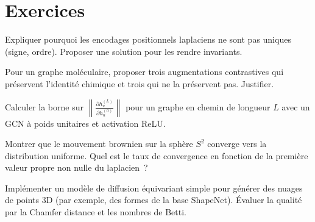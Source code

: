 \section{Exercices}

\begin{exercice}
Expliquer pourquoi les encodages positionnels laplaciens ne sont
pas uniques (signe, ordre). Proposer une solution pour les rendre
invariants.
\end{exercice}

\begin{exercice}
Pour un graphe mol\'eculaire, proposer trois augmentations
contrastives qui pr\'eservent l'identit\'e chimique et trois qui
ne la pr\'eservent pas. Justifier.
\end{exercice}

\begin{exercice}
Calculer la borne sur $\left\|\frac{\partial h_v^{(L)}}
{\partial h_u^{(0)}}\right\|$ pour un graphe en chemin de
longueur $L$ avec un GCN \`a poids unitaires et activation ReLU.
\end{exercice}

\begin{exercice}
Montrer que le mouvement brownien sur la sph\`ere $S^2$ converge
vers la distribution uniforme. Quel est le taux de convergence
en fonction de la premi\`ere valeur propre non nulle du laplacien~?
\end{exercice}

\begin{exercice}[Projet]
Impl\'ementer un mod\`ele de diffusion \'equivariant simple pour
g\'en\'erer des nuages de points 3D (par exemple, des formes de
la base ShapeNet). \'Evaluer la qualit\'e par la Chamfer distance
et les nombres de Betti.
\end{exercice}
